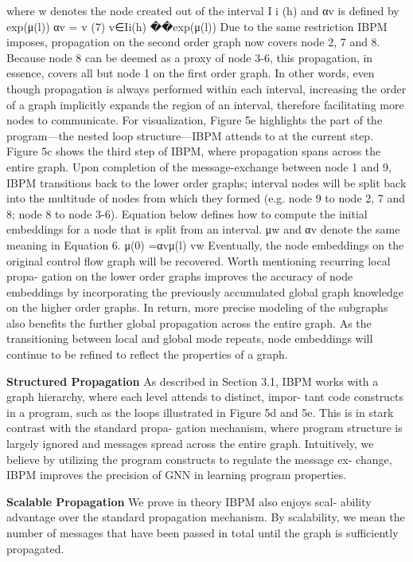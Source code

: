 \documentclass{article}
\begin{document}
where w denotes the node created out of the interval I i (h) and
αv is defined by
exp(μ(l))
αv = v (7)
v∈Ii(h)
 ��exp(μ(l))
Due to the same restriction IBPM imposes, propagation on the second order graph now covers node 2, 7 and 8. Because node 8 can be deemed as a proxy of node 3-6, this propagation, in essence, covers all but node 1 on the first order graph. In other words, even though propagation is always performed within each interval, increasing the order of a graph implicitly expands the region of an interval, therefore facilitating more nodes to communicate. For visualization, Figure 5e highlights the part of the program—the nested loop structure—IBPM attends to at the current step.
Figure 5c shows the third step of IBPM, where propagation spans across the entire graph. Upon completion of the message-exchange between node 1 and 9, IBPM transitions back to the lower order graphs; interval nodes will be split back into the multitude of nodes from which they formed (e.g. node 9 to node 2, 7 and 8; node 8 to node 3-6). Equation below defines how to compute the initial embeddings for a node that is split from an interval. μw and αv denote the same meaning in Equation 6.
μ(0) =αvμ(l) vw
Eventually, the node embeddings on the original control flow graph will be recovered. Worth mentioning recurring local propa- gation on the lower order graphs improves the accuracy of node embeddings by incorporating the previously accumulated global graph knowledge on the higher order graphs. In return, more precise modeling of the subgraphs also benefits the further global propagation across the entire graph. As the transitioning between local and global mode repeats, node embeddings will continue to be refined to reflect the properties of a graph.

\textbf{Structured Propagation} As described in Section 3.1, IBPM works with a graph hierarchy, where each level attends to distinct, impor- tant code constructs in a program, such as the loops illustrated in Figure 5d and 5e. This is in stark contrast with the standard propa- gation mechanism, where program structure is largely ignored and messages spread across the entire graph. Intuitively, we believe by utilizing the program constructs to regulate the message ex- change, IBPM improves the precision of GNN in learning program properties.

\textbf{Scalable Propagation} We prove in theory IBPM also enjoys scal- ability advantage over the standard propagation mechanism. By scalability, we mean the number of messages that have been passed in total until the graph is sufficiently propagated.
\end{document}
